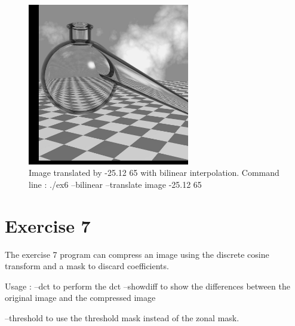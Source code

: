 \documentclass[10pt]{article}
\begin{document}
\begin{figure}[!ht]
	\centering
	\includegraphics[height=200pt]{./ex6/translate2.jpg}
	\caption{Image translated by -25.12 65 with bilinear interpolation. Command line : ./ex6 --bilinear --translate image -25.12 65}
\end{figure}
\clearpage
\section{Exercise 7}
The exercise 7 program can compress an image using the discrete cosine transform and a mask to discard coefficients.

Usage :
--dct to perform the dct
--showdiff to show the differences between the original image and the compressed image

--threshold to use the threshold mask instead of the zonal mask.
\end{document}
